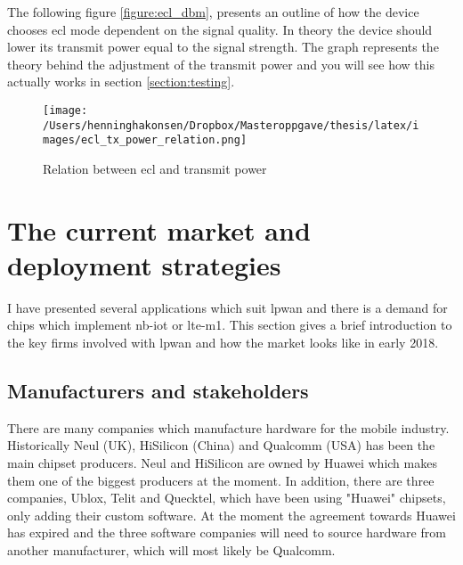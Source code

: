 \documentclass[USenglish]{ifimaster}  %
\begin{document}
The following figure \vref{figure:ecl_dbm}, presents an outline of how the device chooses \acrshort{ecl} mode dependent on the signal quality. In theory the device should lower its transmit power equal to the signal strength. The graph represents the theory behind the adjustment of the transmit power and you will see how this actually works in section \vref{section:testing}.


\begin{figure}[H]
  \centering\texttt{[image: /Users/henninghakonsen/Dropbox/Masteroppgave/thesis/latex/images/ecl\_tx\_power\_relation.png]}
  \caption[\acrshort{ecl} and transmit power relation]{Relation between \acrshort{ecl} and transmit power}
  \label{figure:ecl_dbm}
\end{figure}

\section{The current market and deployment strategies} \label{section:market}
I have presented several applications which suit \acrshort{lpwan} and there is a demand for chips which implement \acrshort{nb-iot} or \acrshort{lte-m1}. This section gives a brief introduction to the key firms involved with \acrshort{lpwan} and how the market looks like in early 2018.

\subsection{Manufacturers and stakeholders} \label{ssection:manufacture}
There are many companies which manufacture hardware for the mobile industry. Historically Neul (UK), HiSilicon (China) and Qualcomm (USA) has been the main chipset producers. Neul and HiSilicon are owned by Huawei which makes them one of the biggest producers at the moment. In addition, there are three companies, Ublox, Telit and Quecktel, which have been using "Huawei" chipsets, only adding their custom software. At the moment the agreement towards Huawei has expired and the three software companies will need to source hardware from another manufacturer, which will most likely be Qualcomm.
\end{document}
